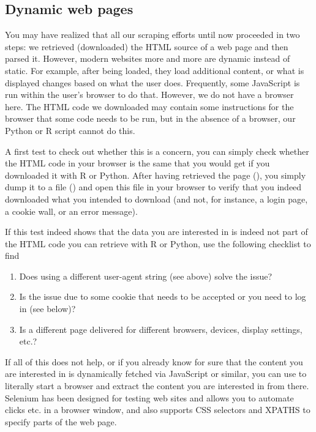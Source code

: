 \subsection{Dynamic web pages}
\label{sec:selenium}

You may have realized that all our scraping efforts until now
proceeded in two steps: we retrieved (downloaded) the HTML source of a
web page and then parsed it. However, modern websites more and more
are dynamic instead of static. For example, after being loaded, they
load additional content, or what is displayed changes based on what
the user does. Frequently, some JavaScript is run within the user's
browser to do that. However, we do not have a browser here. The HTML
code we downloaded may contain some instructions for the browser that
some code needs to be run, but in the absence of a browser, our Python
or R script cannot do this.

A first test to check out whether this is a concern, you can simply
check whether the HTML code in your browser is the same that you would
get if you downloaded it with R or Python.  After having retrieved the
page (), you simply dump it to a file
() and open this file in your browser to verify that
you indeed downloaded what you intended to download (and not, for
instance, a login page, a cookie wall, or an error message).



If this test indeed shows that the data you are interested in is
indeed not part of the HTML code you can retrieve with R or Python,
use the following checklist to find

\begin{enumerate}
\item Does using a different user-agent string (see above) solve the issue?
\item Is the issue due to some cookie that needs to be accepted or you need to log in (see below)?
\item Is a different page delivered for different browsers, devices, display settings, etc.?
\end{enumerate}

If all of this does not help, or if you already know for sure that the
content you are interested in is dynamically fetched via JavaScript or
similar, you can use  to literally start a browser and
extract the content you are interested in from there. Selenium has
been designed for testing web sites and allows you to automate clicks
etc. in a browser window, and also supports CSS selectors and XPATHS
to specify parts of the web page.

